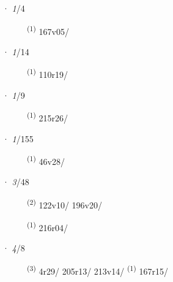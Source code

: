 \ENTRYEND
\noindent{} · \textit{1}/4 \LEMMALINE
\begin{description}
    \item[]  \textsuperscript{(1)} \mbox{167v05/}
\end{description}
\ENTRYEND
\noindent{} · \textit{1}/14 \LEMMALINE
\begin{description}
    \item[]  \textsuperscript{(1)} \mbox{110r19/}
\end{description}
\ENTRYEND
\noindent{} · \textit{1}/9 \LEMMALINE
\begin{description}
    \item[]  \textsuperscript{(1)} \mbox{215r26/}
\end{description}
\ENTRYEND
\noindent{} · \textit{1}/155 \LEMMALINE
\begin{description}
    \item[]  \textsuperscript{(1)} \mbox{46v28/}
\end{description}
\ENTRYEND
\noindent{} · \textit{3}/48 \LEMMALINE
\begin{description}
    \item[]  \textsuperscript{(2)} \mbox{122v10/} \mbox{196v20/}
    \item[]  \textsuperscript{(1)} \mbox{216r04/}
\end{description}
\ENTRYEND
\noindent{} · \textit{4}/8 \LEMMALINE
\begin{description}
    \item[]  \textsuperscript{(3)} \mbox{4r29/} \mbox{205r13/} \mbox{213v14/} \CASEBREAK {} \textsuperscript{(1)} \mbox{167r15/}
\end{description}
